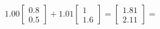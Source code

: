 \documentclass[preview]{standalone}
\begin{document}
\begin{align*}
1.00 \begin{bmatrix} 0.8 \\ 0.5 \end{bmatrix} + 1.01 \begin{bmatrix} 1 \\ 1.6 \end{bmatrix} = \begin{bmatrix} 1.81 \\ 2.11 \end{bmatrix} =
\end{align*}
\end{document}
